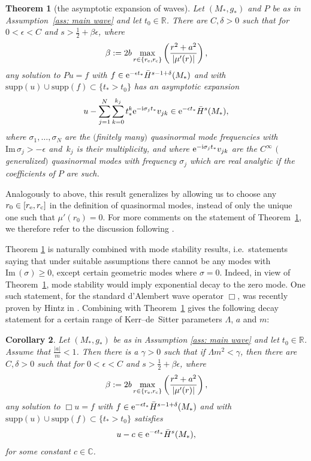 \documentclass[pdftex]{sigma}
\newcommand{\e}{\epsilon}
\renewcommand{\Im}{\mathrm{Im} \,}
\newcommand{\supp}{\mathrm{supp}}
\newcommand{\de}{\delta}
\renewcommand{\b}{\beta}
\newcommand{\abs}[1]{\left\lvert#1\right\rvert}
\newcommand{\s}{\sigma}
\newcommand{\R}[0]{\mathbb{R}}
\newcommand{\C}[0]{\mathbb{C}}
\numberwithin{equation}{section}
\newtheorem{Theorem}{Theorem}[section]
\newtheorem{Corollary}[Theorem]{Corollary}
\begin{document}
\begin{Theorem}[the asymptotic expansion of waves] \label{thm: asymptotic expansion} Let $(M_*, g_*)$ and $P$ be as in Assumption~{\rm\ref{ass: main wave}} and let $t_0 \in \R$.
There are $C, \de > 0$ such that for $0 < \e < C$ and $s > \frac12 + \b \e$, where
\[
	\b
		:= 2b \max_{r \in \{r_{\rm e}, r_{\rm c}\}} \left( \frac{r^2 + a^2}{\abs{\mu'(r)}} \right),
\]
any solution to $Pu = f$
with $f \in {\rm e}^{- \e t_*} \bar H^{s - 1 + \de}(M_*)$ and with $\supp(u) \cup \supp(f) \subset \{t_* > t_0\}$ has an asymptotic expansion
\begin{align*}
	u - \sum_{j = 1}^N \sum_{k = 0}^{k_j} t_*^k {\rm e}^{-{\rm i} \s_j t_*} v_{jk} \in {\rm e}^{- \e t_*} \bar H^s(M_*),
\end{align*}
where $\s_1, \hdots, \s_N$ are the $($finitely many$)$ quasinormal mode frequencies with $\Im \s_j > - \e$
and~$k_j$ is their multiplicity, and where ${\rm e}^{-{\rm i}\s_j t_*}v_{jk}$ are
the $C^\infty$ $($generalized$)$ quasinormal modes with frequency $\s_j$ which are
real analytic if the coefficients of $P$ are such.
\end{Theorem}

Analogously to above, this result generalizes \cite[Theorem~1.6]{PV2023} by allowing us to choose any~${r_0 \in [r_{\rm e}, r_{\rm c}]}$ in the definition of quasinormal modes, instead of only the unique one such that $\mu'(r_0) = 0$.
For more comments on the statement of Theorem~\ref{thm: asymptotic expansion}, we therefore refer to the discussion following \cite[Theorem~1.6]{PV2023}.

Theorem \ref{thm: asymptotic expansion} is naturally combined with mode stability results, i.e.~statements saying that under suitable assumptions there cannot be any modes with $\Im(\s) \geq 0$,
except certain geometric modes where $\s = 0$.
Indeed, in view of Theorem~\ref{thm: asymptotic expansion}, mode stability would imply exponential decay to the zero mode.
One such statement, for the standard d'Alembert wave operator $\Box$, was recently proven by Hintz in \cite{H2021}.
Combining \cite[Theorem~1.1]{H2021} with Theorem~\ref{thm: asymptotic expansion} gives the following decay statement for a certain range of Kerr--de~Sitter parameters $\Lambda$, $a$ and $m$:

\begin{Corollary}
Let $(M_*, g_*)$ be as in Assumption {\rm\ref{ass: main wave}} and let $t_0 \in \R$.
Assume that $\frac {\abs a}m < 1$.
Then there is a $\gamma > 0$ such that if $\Lambda m^2 < \gamma$, then there are $C, \de > 0$ such that for $0 < \e < C$ and $s > \frac12 + \b \e$,
where
\[
	\b
		:= 2b \max_{r \in \{r_{\rm e}, r_{\rm c}\}} \left( \frac{r^2 + a^2}{\abs{\mu'(r)}} \right),
\]
any solution to $\Box u = f$
with $f \in {\rm e}^{- \e t_*} \bar H^{s - 1 + \de}(M_*)$ and with $\supp(u) \cup \supp(f) \subset \{t_* > t_0\}$ satisfies
\begin{align*}
	u - c \in {\rm e}^{- \e t_*} \bar H^s(M_*),
\end{align*}
for some constant $c \in \C$.
\end{Corollary}
\end{document}
